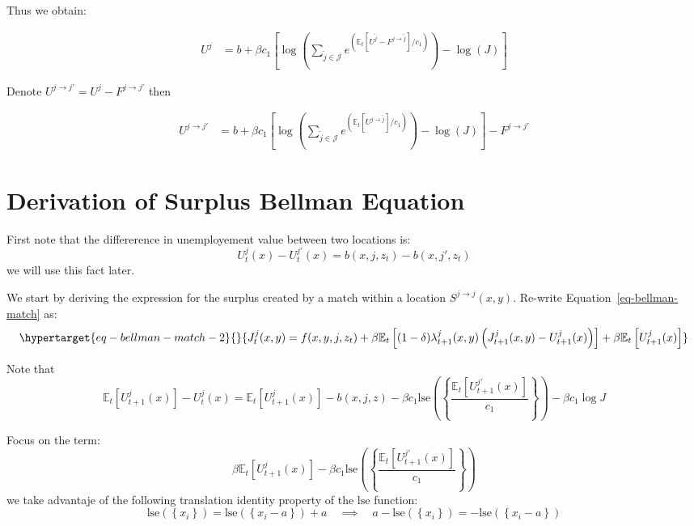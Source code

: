 \documentclass[
  letterpaper,
  DIV=11,
  numbers=noendperiod]{scrreprt}
\begin{document}
Thus we obtain:

\begin{align*}
U^{j} &= b + \beta c_1\left[
\log{\left(\sum_{\tilde{j}\in \mathcal{J}}e^{\left(\mathbb{E}_t\left[U^{\tilde{j}} - F^{j \to \tilde{j}}\right] /c_1\right)}\right)} - \log{\left(J\right)} \right]
\end{align*}

Denote \(U^{j \to j'} = U^{j} - F^{j \to j'}\) then

\begin{align*}
U^{j \to j' } &= b + \beta c_1\left[
\log{\left(\sum_{\tilde{j}\in \mathcal{J}}e^{\left(\mathbb{E}_t\left[U^{j \to \tilde{j}}\right] /c_1\right)}\right)} - \log{\left(J\right)} \right] - F^{j \to j'}
\end{align*}

\hypertarget{sec-appendix_surplus}{%
\chapter{Derivation of Surplus Bellman
Equation}\label{sec-appendix_surplus}}

First note that the differerence in unemployement value between two
locations is:
\[U^{j}_{t}(x) - U^{j'}_{t}(x) = b(x,j,z_t) - b(x,j',z_t) \] we will use
this fact later.

We start by deriving the expression for the surplus created by a match
within a location \(S^{j\to j}(x,y)\). Re-write
Equation~\ref{eq-bellman-match} as:
\begin{equation}\protect\hypertarget{eq-bellman-match-2}{}{J^j_t(x,y) = f(x,y,j,z_t) + \beta \mathbb{E}_t\left[(1-\delta)\lambda^j_{t+1}(x,y)\left(J^j_{t+1}(x,y)-U_{t+1}^j(x)\right) \right]+ \beta \mathbb{E}_t\left[U^j_{t+1}(x)\right]}\label{eq-bellman-match-2}\end{equation}

Note that
\[\mathbb{E}_t\left[U^j_{t+1}(x)\right] - U^j_{t}(x) = \mathbb{E}_t\left[U^j_{t+1}(x)\right] - b(x,j,z)-\beta c_{1}\text{lse}\left(\left\{\frac{\mathbb{E}_{t}[U^{j'}_{t+1}(x)]}{c_{1}}\right\}\right) - \beta c_{1}\log{J}\]

Focus on the term:
\[\beta \mathbb{E}_t\left[U^j_{t+1}(x)\right] - \beta c_{1}\text{lse}\left(\left\{\frac{\mathbb{E}_{t}[U^{j'}_{t+1}(x)]}{c_{1}}\right\}\right)\]
we take advantaje of the following translation identity property of the
\(\text{lse}\) function:
\[\text{lse}\left(\left\{x_{i}\right\}\right)=\text{lse}\left(\left\{x_{i}-a\right\}\right)+a \quad \implies \quad a - \text{lse}\left(\left\{x_{i}\right\}\right) = - \text{lse}\left(\left\{x_{i}-a\right\}\right)\]
\end{document}
